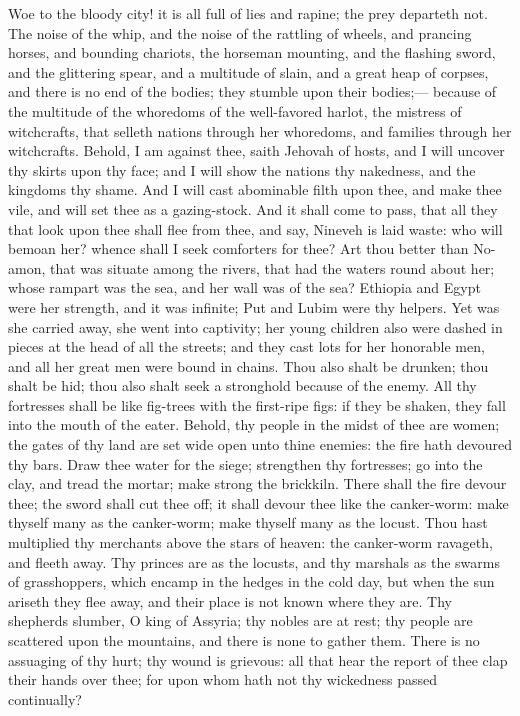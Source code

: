 Woe to the bloody city! it is all full of lies and rapine; the prey departeth not. The noise of the whip, and the noise of the rattling of wheels, and prancing horses, and bounding chariots, the horseman mounting, and the flashing sword, and the glittering spear, and a multitude of slain, and a great heap of corpses, and there is no end of the bodies; they stumble upon their bodies;— because of the multitude of the whoredoms of the well-favored harlot, the mistress of witchcrafts, that selleth nations through her whoredoms, and families through her witchcrafts. Behold, I am against thee, saith Jehovah of hosts, and I will uncover thy skirts upon thy face; and I will show the nations thy nakedness, and the kingdoms thy shame. And I will cast abominable filth upon thee, and make thee vile, and will set thee as a gazing-stock. And it shall come to pass, that all they that look upon thee shall flee from thee, and say, Nineveh is laid waste: who will bemoan her? whence shall I seek comforters for thee?  Art thou better than No-amon, that was situate among the rivers, that had the waters round about her; whose rampart was the sea, and her wall was of the sea? Ethiopia and Egypt were her strength, and it was infinite; Put and Lubim were thy helpers. Yet was she carried away, she went into captivity; her young children also were dashed in pieces at the head of all the streets; and they cast lots for her honorable men, and all her great men were bound in chains. Thou also shalt be drunken; thou shalt be hid; thou also shalt seek a stronghold because of the enemy. All thy fortresses shall be like fig-trees with the first-ripe figs: if they be shaken, they fall into the mouth of the eater. Behold, thy people in the midst of thee are women; the gates of thy land are set wide open unto thine enemies: the fire hath devoured thy bars. Draw thee water for the siege; strengthen thy fortresses; go into the clay, and tread the mortar; make strong the brickkiln. There shall the fire devour thee; the sword shall cut thee off; it shall devour thee like the canker-worm: make thyself many as the canker-worm; make thyself many as the locust. Thou hast multiplied thy merchants above the stars of heaven: the canker-worm ravageth, and fleeth away. Thy princes are as the locusts, and thy marshals as the swarms of grasshoppers, which encamp in the hedges in the cold day, but when the sun ariseth they flee away, and their place is not known where they are. Thy shepherds slumber, O king of Assyria; thy nobles are at rest; thy people are scattered upon the mountains, and there is none to gather them. There is no assuaging of thy hurt; thy wound is grievous: all that hear the report of thee clap their hands over thee; for upon whom hath not thy wickedness passed continually? 